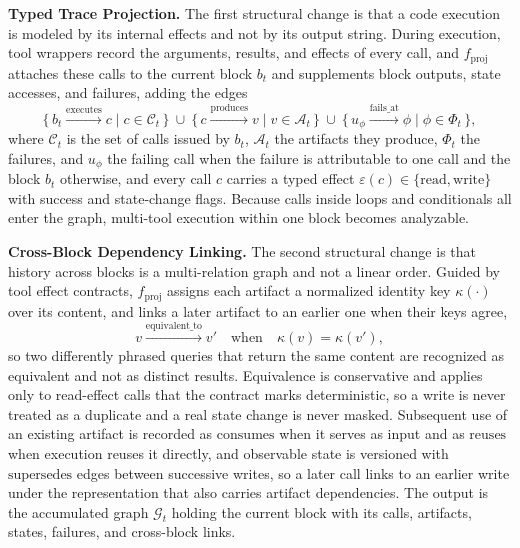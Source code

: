 \textbf{Typed Trace Projection.}\quad
The first structural change is that a code execution is modeled by its internal effects and not by its output string.
During execution, tool wrappers record the arguments, results, and effects of every call, and $f_{\mathrm{proj}}$ attaches these calls to the current block $b_t$ and supplements block outputs, state accesses, and failures, adding the edges
\begin{equation}
\{\, b_t \xrightarrow{\mathrm{executes}} c \mid c \in \mathcal{C}_t \,\}
\ \cup\
\{\, c \xrightarrow{\mathrm{produces}} v \mid v \in \mathcal{A}_t \,\}
\ \cup\
\{\, u_\phi \xrightarrow{\mathrm{fails\_at}} \phi \mid \phi \in \Phi_t \,\},
\label{eq:proj}
\end{equation}
where $\mathcal{C}_t$ is the set of calls issued by $b_t$, $\mathcal{A}_t$ the artifacts they produce, $\Phi_t$ the failures, and $u_\phi$ the failing call when the failure is attributable to one call and the block $b_t$ otherwise, and every call $c$ carries a typed effect $\varepsilon(c)\in\{\mathrm{read},\mathrm{write}\}$ with success and state-change flags.
Because calls inside loops and conditionals all enter the graph, multi-tool execution within one block becomes analyzable.

\textbf{Cross-Block Dependency Linking.}\quad
The second structural change is that history across blocks is a multi-relation graph and not a linear order.
Guided by tool effect contracts, $f_{\mathrm{proj}}$ assigns each artifact a normalized identity key $\kappa(\cdot)$ over its content, and links a later artifact to an earlier one when their keys agree,
\begin{equation}
v \xrightarrow{\mathrm{equivalent\_to}} v' \quad\text{when}\quad \kappa(v)=\kappa(v'),
\label{eq:equiv}
\end{equation}
so two differently phrased queries that return the same content are recognized as equivalent and not as distinct results.
Equivalence is conservative and applies only to read-effect calls that the contract marks deterministic, so a write is never treated as a duplicate and a real state change is never masked.
Subsequent use of an existing artifact is recorded as $\mathrm{consumes}$ when it serves as input and as $\mathrm{reuses}$ when execution reuses it directly, and observable state is versioned with $\mathrm{supersedes}$ edges between successive writes, so a later call links to an earlier write under the representation that also carries artifact dependencies.
The output is the accumulated graph $\mathcal{G}_t$ holding the current block with its calls, artifacts, states, failures, and cross-block links.

